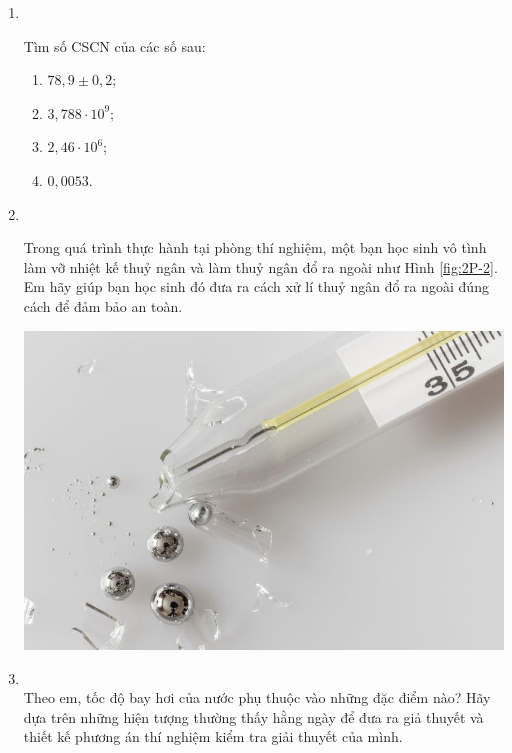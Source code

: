 \let\lesson\undefined
\newcommand{\lesson}{\phantomlesson{Bài 3.}}


\setcounter{section}{0}
\begin{enumerate}[label=\bfseries Bài \arabic*:,leftmargin=1.5cm]
	\item{}\\
	{Tìm số CSCN của các số sau:
		\begin{enumerate}[label=\alph*)]
			\item $78,9\pm 0,2$;
			\item $3,788\cdot10^9$;
			\item $2,46\cdot10^6$;
			\item $0,0053$.
		\end{enumerate}
}
	\item {}\\
	{Trong quá trình thực hành tại phòng thí nghiệm, một bạn học sinh vô tình làm vỡ nhiệt kế thuỷ ngân và làm thuỷ ngân đổ ra ngoài như Hình \ref{fig:2P-2}. Em hãy giúp bạn học sinh đó đưa ra cách xử lí thuỷ ngân đổ ra ngoài đúng cách để đảm bảo an toàn.
		\begin{center}
			\includegraphics[width=0.3\linewidth]{../figs/VN10-2022-PH-TP002-P-2}
			\label{fig:2P-2}
		\end{center}
	}
	
	\item {}\\
	{Theo em, tốc độ bay hơi của nước phụ thuộc vào những đặc điểm nào? Hãy dựa trên những hiện tượng thường thấy hằng ngày để đưa ra giả thuyết và thiết kế phương án thí nghiệm kiểm tra giải thuyết của mình.
	}
	

\end{enumerate}

